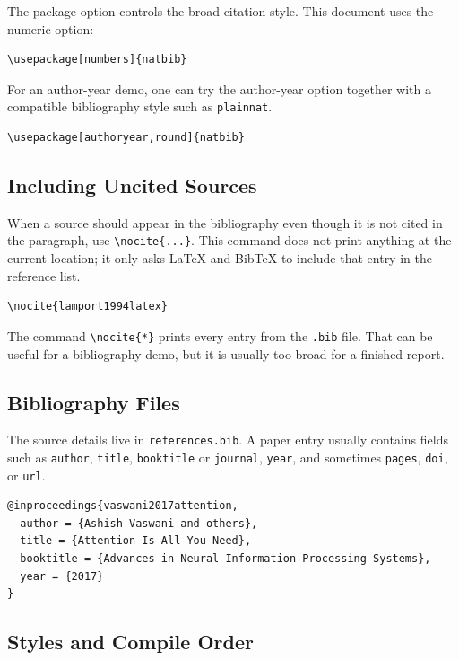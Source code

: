 \documentclass[11pt,a4paper]{article}
\begin{document}
The package option controls the broad citation style. This document uses the
numeric option:

\begin{verbatim}
\usepackage[numbers]{natbib}
\end{verbatim}

For an author-year demo, one can try the author-year option together with a
compatible bibliography style such as \texttt{plainnat}.

\begin{verbatim}
\usepackage[authoryear,round]{natbib}
\end{verbatim}

\subsection{Including Uncited Sources}

When a source should appear in the bibliography even though it is not cited in
the paragraph, use \verb|\nocite{...}|. This command does not print anything at
the current location; it only asks LaTeX and BibTeX to include that entry in the
reference list.

\begin{verbatim}
\nocite{lamport1994latex}
\end{verbatim}

\nocite{lamport1994latex}

The command \verb|\nocite{*}| prints every entry from the \texttt{.bib} file.
That can be useful for a bibliography demo, but it is usually too broad for a
finished report.

\subsection{Bibliography Files}

The source details live in \texttt{references.bib}. A paper entry usually
contains fields such as \texttt{author}, \texttt{title}, \texttt{booktitle} or
\texttt{journal}, \texttt{year}, and sometimes \texttt{pages}, \texttt{doi}, or
\texttt{url}.

\begin{verbatim}
@inproceedings{vaswani2017attention,
  author = {Ashish Vaswani and others},
  title = {Attention Is All You Need},
  booktitle = {Advances in Neural Information Processing Systems},
  year = {2017}
}
\end{verbatim}

\subsection{Styles and Compile Order}
\end{document}
